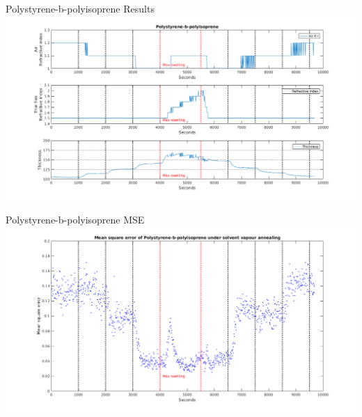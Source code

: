 \documentclass[10pt]{beamer}
\begin{document}
\begin{frame}{Polystyrene-b-polyisoprene Results}
\includegraphics[width=\textwidth]{PSbPIsinglemodel1.png}
\end{frame}

\begin{frame}{Polystyrene-b-polyisoprene MSE}
\includegraphics[width=\textwidth]{PSbPIsinglemodel2.png}
\end{frame}
\end{document}
